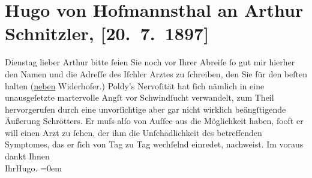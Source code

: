 

         
         \renewcommand{\erwaehntePersonen}{Personen: Leopold von Andrian-Werburg, Leopold Schrötter von Kristelli, Hermann Widerhofer}
         \renewcommand{\erwaehnteOrte}{Orte: Altaussee, Bad Fusch, Bad Ischl, Wien}
         \renewcommand{\erwaehnteWerke}{}
               \section[Hugo von Hofmannsthal an Arthur Schnitzler, {[}20. 7. 1897{]}]{ Hugo von Hofmannsthal an Arthur Schnitzler, {[}20. 7. 1897{]}}\nopagebreak{}\rehead{ }\begin{ledgroupsized}[t]{13cm}\normalsize\beginnumbering \toendnotes[C]{\smallbreak\pagebreak[2]} 
\pstart
           \raggedleft{}{\pb}Dienstag\pend
           \pstart{}lieber Arthur\pend\pstart
           bitte ſeien Sie noch vor Ihrer Abreiſe ſo gut mir hierher den Namen und die
                    Adreſſe des Iſchler Arztes zu ſchreiben, den
                    Sie für den beſten halten (\uline{neben}{ }Widerhofer.)
                        Poldy’s Nervoſität hat ſich nämlich in
                    eine unausgeſetzte martervolle Angſt vor Schwindſucht {\pb}verwandelt, zum Theil
                    hervorgerufen durch eine unvorſichtige aber gar nicht wirklich beängſtigende
                    Äußerung Schrötters. Er muſs alſo von Auſſee aus die Möglichkeit haben, ſooft er
                    will einen Arzt zu ſehen, der ihm die Unſchädlichkeit {\pb}des betreffenden Symptomes,
                    das er ſich von Tag zu Tag wechſelnd einredet, nachweist.\pend
           \pstart
           Im voraus dankt Ihnen{\\[\baselineskip]} Ihr\spacefill\mbox{Hugo.}\pend
           \leftskip=0em{}
         
         \endnumbering{}\end{ledgroupsized}  \newcommand{\dateiname}{L00708}\newcommand{\titel}{Hugo von Hofmannsthal an Arthur Schnitzler, [20. 7. 1897]}\newcommand{\editorInnen}{Martin Anton Müller und Gerd-Hermann Susen}
      